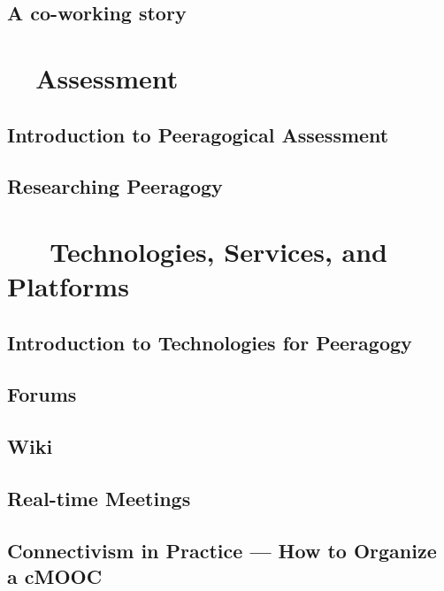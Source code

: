 \documentclass[ebook,12pt, twoside]{memoir}
\begin{document}
\chapter[\textbf{A co-working story}]{A co-working story}
%



\part{~~Assessment} \label{assessment-part} %
%
\chapter[\textbf{Peeragogical Assessment}]{Introduction to Peeragogical Assessment}

%
\chapter[\textbf{Researching Peeragogy}]{Researching Peeragogy}
%



\part{~~~Technologies, Services, and Platforms } \label{technologies-part} %
%
\chapter[\textbf{Peeragogy Technology}]{Introduction to Technologies for Peeragogy}

%
\chapter[\textbf{Forums}]{ Forums } 
%

%
\chapter[\textbf{Wiki}]{ Wiki } 
%

%
\chapter[\textbf{Real-time Meetings}]{ Real-time Meetings } 
%

%
\chapter[\textbf{How to Organize a MOOC}]{ Connectivism in Practice ---  How to Organize a cMOOC}
%

\end{document}
